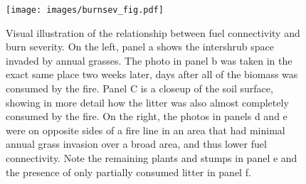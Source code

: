 \documentclass[
  12pt,
]{article}
\begin{document}
\newpage

\begin{figure}
\centering
\texttt{[image: images/burnsev\_fig.pdf]}
\caption{Visual illustration of the relationship between fuel
connectivity and burn severity. On the left, panel a shows the
intershrub space invaded by annual grasses. The photo in panel b was
taken in the exact same place two weeks later, days after all of the
biomass was consumed by the fire. Panel C is a closeup of the soil
surface, showing in more detail how the litter was also almost
completely consumed by the fire. On the right, the photos in panels d
and e were on opposite sides of a fire line in an area that had minimal
annual grass invasion over a broad area, and thus lower fuel
connectivity. Note the remaining plants and stumps in panel e and the
presence of only partially consumed litter in panel f.}
\end{figure}
\end{document}
